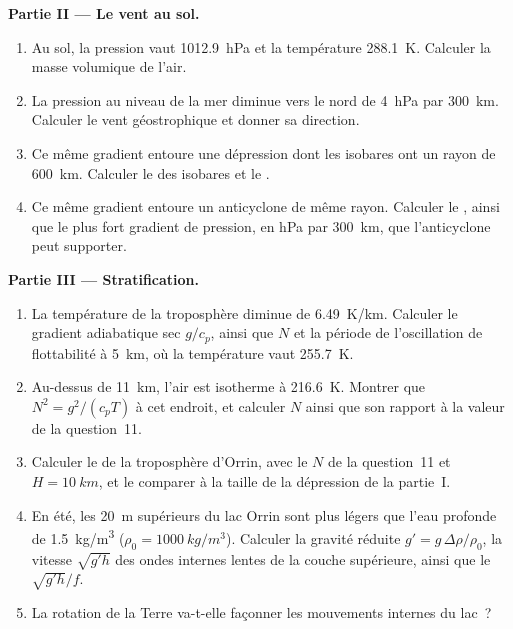 \begin{problem}
\medskip\noindent\textbf{Partie II --- Le vent au sol.}
\begin{enumerate}[resume]
\item Au sol, la pression vaut \qty{1012.9}{hPa} et la température
  \qty{288.1}{K}. Calculer la masse volumique de l'air.
\item La pression au niveau de la mer diminue vers le nord de \qty{4}{hPa} par
  \qty{300}{km}. Calculer le vent géostrophique et donner sa direction.
\item Ce même gradient entoure une dépression dont les isobares ont un rayon
  de \qty{600}{km}. Calculer le  des isobares et le .
\item Ce même gradient entoure un anticyclone de même rayon.
  Calculer le , ainsi que le plus fort gradient de pression, en
  \unit{hPa} par \qty{300}{km}, que l'anticyclone peut supporter.
\end{enumerate}

\medskip\noindent\textbf{Partie III --- Stratification.}
\begin{enumerate}[resume]
\item La température de la troposphère diminue de \qty{6.49}{K/km}.
  Calculer le gradient adiabatique sec $g/c_p$, ainsi que $N$ et la période de
  l'oscillation de flottabilité à \qty{5}{km}, où la température vaut
  \qty{255.7}{K}.
\item Au-dessus de \qty{11}{km}, l'air est isotherme à \qty{216.6}{K}. Montrer que
  $N^2 = g^2/(c_pT)$ à cet endroit, et calculer $N$ ainsi que son rapport à la valeur de
  la question~11.
\item Calculer le  de la troposphère d'Orrin, avec le $N$ de
  la question~11 et $H = \qty{10}{km}$, et le comparer à la taille de la
  dépression de la partie~I.
\item En été, les \qty{20}{m} supérieurs du lac Orrin sont plus légers que
  l'eau profonde de \qty{1.5}{kg/m^3} ($\rho_0 = \qty{1000}{kg/m^3}$). Calculer
  la gravité réduite $g' = g\,\Delta\rho/\rho_0$, la vitesse $\sqrt{g'h}$ des
  ondes internes lentes de la couche supérieure, ainsi que le 
  $\sqrt{g'h}/f$.
\item La rotation de la Terre va-t-elle façonner les mouvements internes du lac~?
\end{enumerate}


\end{problem}
